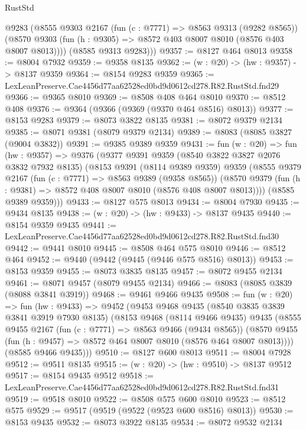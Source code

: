 \begin{lexlean}{RustStd}
\begin{coremodule}
        @9283
        (@8555
          @9303
          @2167
          (fun (c : @7771) => @8563 @9313 (@9282 @8565))
          (@8570 @9303 (fun (h : @9305) => @8572 @403 @8007 @8010 (@8576 @403 @8007 @8013))))
        (@8585 @9313 @9283)))
@9357 := @8127 @464 @8013
@9358 := @8004 @7932
@9359 := @9358 @8135
@9362 := (w : @20) -> (hw : @9357) -> @8137 @9359
@9364 := @8154 @9283 @9359
@9365 := LexLeanPreserve.Cae4456d77aa62528ed0bd9d0612cd278.R82.RustStd.fnd29
@9366 := @9365 @8010
@9369 := @8508 @408 @464 @8010
@9370 := @8512 @408
@9376 := @9364 (@9366 (@9369 (@9370 @464 @8516) @8013))
@9377 := @8153 @9283
@9379 := @8073 @3822 @8135
@9381 := @8072 @9379 @2134
@9385 := @8071 @9381 (@8079 @9379 @2134)
@9389 := @8083 (@8085 @3827 (@9004 @3832))
@9391 := @9385 @9389 @9359
@9431 := fun (w : @20) =>
  fun (hw : @9357) =>
  @9376
    (@9377
      @9391
      @9359
      (@8540 @3822 @3827 @2076 @3832 @7932 @8135)
      (@8153
        @9391
        (@8114 @9389 @9359)
        @9359
        (@8555
          @9379
          @2167
          (fun (c : @7771) => @8563 @9389 (@9358 @8565))
          (@8570 @9379 (fun (h : @9381) => @8572 @408 @8007 @8010 (@8576 @408 @8007 @8013))))
        (@8585 @9389 @9359)))
@9433 := @8127 @575 @8013
@9434 := @8004 @7930
@9435 := @9434 @8135
@9438 := (w : @20) -> (hw : @9433) -> @8137 @9435
@9440 := @8154 @9359 @9435
@9441 := LexLeanPreserve.Cae4456d77aa62528ed0bd9d0612cd278.R82.RustStd.fnd30
@9442 := @9441 @8010
@9445 := @8508 @464 @575 @8010
@9446 := @8512 @464
@9452 := @9440 (@9442 (@9445 (@9446 @575 @8516) @8013))
@9453 := @8153 @9359
@9455 := @8073 @3835 @8135
@9457 := @8072 @9455 @2134
@9461 := @8071 @9457 (@8079 @9455 @2134)
@9466 := @8083 (@8085 @3839 (@8088 @3841 @3919))
@9468 := @9461 @9466 @9435
@9508 := fun (w : @20) =>
  fun (hw : @9433) =>
  @9452
    (@9453
      @9468
      @9435
      (@8540 @3835 @3839 @3841 @3919 @7930 @8135)
      (@8153
        @9468
        (@8114 @9466 @9435)
        @9435
        (@8555
          @9455
          @2167
          (fun (c : @7771) => @8563 @9466 (@9434 @8565))
          (@8570 @9455 (fun (h : @9457) => @8572 @464 @8007 @8010 (@8576 @464 @8007 @8013))))
        (@8585 @9466 @9435)))
@9510 := @8127 @600 @8013
@9511 := @8004 @7928
@9512 := @9511 @8135
@9515 := (w : @20) -> (hw : @9510) -> @8137 @9512
@9517 := @8154 @9435 @9512
@9518 := LexLeanPreserve.Cae4456d77aa62528ed0bd9d0612cd278.R82.RustStd.fnd31
@9519 := @9518 @8010
@9522 := @8508 @575 @600 @8010
@9523 := @8512 @575
@9529 := @9517 (@9519 (@9522 (@9523 @600 @8516) @8013))
@9530 := @8153 @9435
@9532 := @8073 @3922 @8135
@9534 := @8072 @9532 @2134

\end{coremodule}
\end{lexlean}
